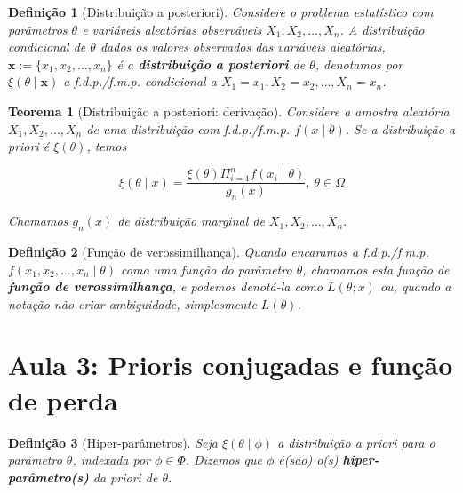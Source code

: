 \documentclass{article}
\newtheorem{theorem}{Teorema}
\newtheorem{definition}{Definição}
\begin{document}
\begin{definition}[Distribuição a posteriori]
Considere o problema estatístico com parâmetros $\theta$ e variáveis aleatórias observáveis $X_1, X_2, \ldots, X_n$. A distribuição condicional de $\theta$ dados os valores observados das variáveis aleatórias, $\textbf{x} := \{x_1, x_2, \ldots, x_n\}$ é a \textbf{distribuição a posteriori} de $\theta$, denotamos por $\xi(\theta \mid \textbf{x})$ a f.d.p./f.m.p. condicional a $X_1 = x_1, X_2 = x_2, \ldots, X_n = x_n$.
\end{definition}

\begin{theorem}[Distribuição a posteriori: derivação]
Considere a amostra aleatória $X_1, X_2, \ldots, X_n$ de uma distribuição com f.d.p./f.m.p. $f(x \mid \theta)$. Se a distribuição a priori é $\xi(\theta)$, temos

\begin{equation}
\xi(\theta \mid x) = \frac{\xi(\theta) \Pi_{i = 1}^{n} f(x_i \mid \theta)}{g_n(x)}, \ \theta \in \Omega
\end{equation}

Chamamos $g_n(x)$ de distribuição marginal de $X_1, X_2, \ldots, X_n$.
\end{theorem}

\begin{definition}[Função de verossimilhança]
Quando encaramos a f.d.p./f.m.p. $f(x_1, x_2, \ldots, x_n \mid \theta)$ como uma função do parâmetro $\theta$, chamamos esta função de \textbf{função de verossimilhança}, e podemos denotá-la como $L(\theta; x)$ ou, quando a notação não criar ambiguidade, simplesmente $L(\theta)$.
\end{definition}

\section*{Aula 3: Prioris conjugadas e função de perda}
\label{s3}
\begin{definition}[Hiper-parâmetros]
Seja $\xi(\theta \mid \phi)$ a distribuição a priori para o parâmetro $\theta$, indexada por $\phi \in \Phi$. Dizemos que $\phi$ é(são) o(s) \textbf{hiper-parâmetro(s)} da priori de $\theta$.
\end{definition}
\end{document}
